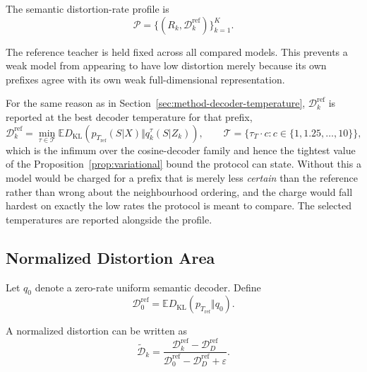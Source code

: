 \documentclass[11pt]{article}
\newcommand{\KL}{D_{\mathrm{KL}}}
\newcommand{\E}{\mathbb{E}}
\newcommand{\cD}{\mathcal{D}}
\begin{document}
The semantic distortion-rate profile is
\begin{equation}
\boxed{
    \mathcal P
    =
    \{
        (R_k,\cD_k^{\mathrm{ref}})
    \}_{k=1}^{K}.
}
\end{equation}

The reference teacher is held fixed across all compared models.
This prevents a weak model from appearing to have low distortion merely because its own prefixes agree with its own weak full-dimensional representation.

For the same reason as in Section~\ref{sec:method-decoder-temperature}, $\cD_k^{\mathrm{ref}}$ is reported at the best decoder temperature for that prefix,
\begin{equation}
    \cD_k^{\mathrm{ref}}
    =
    \min_{\tau\in\mathcal T}
    \E
    \KL
    \left(
        p_{T_{\mathrm{ref}}}(S|X)
        \Vert
        q_k^{\tau}(S|Z_k)
    \right),
    \qquad
    \mathcal T=\{\tau_T\cdot c : c\in\{1,1.25,\ldots,10\}\},
\end{equation}
which is the infimum over the cosine-decoder family and hence the tightest value of the Proposition~\ref{prop:variational} bound the protocol can state.
Without this a model would be charged for a prefix that is merely less \emph{certain} than the reference rather than wrong about the neighbourhood ordering, and the charge would fall hardest on exactly the low rates the protocol is meant to compare.
The selected temperatures are reported alongside the profile.


\subsection{Normalized Distortion Area}

Let $q_0$ denote a zero-rate uniform semantic decoder.
Define
\begin{equation}
    \cD_0^{\mathrm{ref}}
    =
    \E
    \KL(
        p_{T_{\mathrm{ref}}}
        \Vert q_0
    ).
\end{equation}

A normalized distortion can be written as
\begin{equation}
    \widetilde{\cD}_k
    =
    \frac{
        \cD_k^{\mathrm{ref}}
        -
        \cD_D^{\mathrm{ref}}
    }{
        \cD_0^{\mathrm{ref}}
        -
        \cD_D^{\mathrm{ref}}
        +\varepsilon
    }.
\end{equation}
\end{document}
